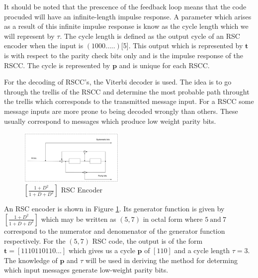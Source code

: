 \documentclass[twocolumn]{article}
\begin{document}
It should be noted that the prescence of the feedback loop means that the code procuded will have an infinite-length impulse response. A parameter which arises as a result of this infinite impulse response is know as the cycle length which we will represent by $\tau$. The cycle length is defined as the output cycle of an RSC encoder when the input is $(1 0 0 0 .....)$[5]. This output which is represented by $\textbf{t} $ is with respect to the parity check bits only and is the impulse response of the RSCC. The cycle is represented by $\textbf{p}$ and is unique for each RSCC. 


For the decoding of RSCC's, the Viterbi decoder is used. The idea is to go through the trellis of the RSCC and determine the most probable path throught the trellis which corresponds to the transmitted message input. For a RSCC some message inputs are more prone to being decoded wrongly than others. These usually correspond to messages which produce low weight parity bits. 

\begin{figure}[h]
\centering
		\includegraphics[width=0.45\textwidth]{RSCExample3.pdf}
		\caption{$[\frac{1+D^2}{1+D+D^2}]$  RSC Encoder}
		\label{fig1}
		\end{figure}
		
An RSC encoder is shown in Figure \ref{fig1}. Its generator function is given by $[\frac{1+D^2}{1+D+D^2}]$ which may be written as $(5,7)$ in octal form where $5 ~ \text{and} ~ 7$ correspond to the numerator and denomenator of the generator function respectively. 
 For the $(5,7)$ RSC code, the output is of the form $\textbf{t}=[1 1 1 0 1 1 0 1 1 0 ...]$ which gives us a cycle $\textbf{p}$ of $[1 1 0]$ and a cycle length $\tau =3$.
The knowledge of $\textbf{p}$ and $\tau$ will be used in deriving the method for determing which input messages generate low-weight parity bits. 
\end{document}

